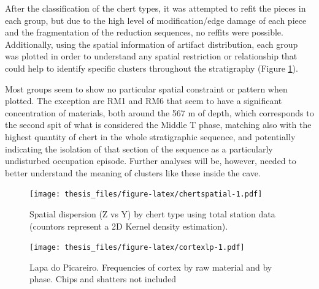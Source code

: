 \documentclass[12pt,twoside]{reedthesis}
\begin{document}
After the classification of the chert types, it was attempted to refit the pieces in each group, but due to the high level of modification/edge damage of each piece and the fragmentation of the reduction sequences, no reffits were possible. Additionally, using the spatial information of artifact distribution, each group was plotted in order to understand any spatial restriction or relationship that could help to identify specific clusters throughout the stratigraphy (Figure \ref{fig:chertspatial}).

Most groups seem to show no particular spatial constraint or pattern when plotted. The exception are RM1 and RM6 that seem to have a significant concentration of materials, both around the 567 m of depth, which corresponds to the second spit of what is considered the Middle T phase, matching also with the highest quantity of chert in the whole stratigraphic sequence, and potentially indicating the isolation of that section of the sequence as a particularly undisturbed occupation episode. Further analyses will be, however, needed to better understand the meaning of clusters like these inside the cave.
\begin{figure}
\centering
\texttt{[image: thesis\_files/figure-latex/chertspatial-1.pdf]}
\caption{\label{fig:chertspatial}Spatial dispersion (Z vs Y) by chert type using total station data (countors represent a 2D Kernel density estimation).}
\end{figure}
\begin{figure}
\centering
\texttt{[image: thesis\_files/figure-latex/cortexlp-1.pdf]}
\caption{\label{fig:cortexlp}Lapa do Picareiro. Frequencies of cortex by raw material and by phase. Chips and shatters not included}
\end{figure}
\begin{table}

\caption{\label{tab:cortexabtg}Lapa do Picareiro - U/Lower T. Frequencies of cortex type by raw material.}
\centering
{}
\end{table}
\end{document}
